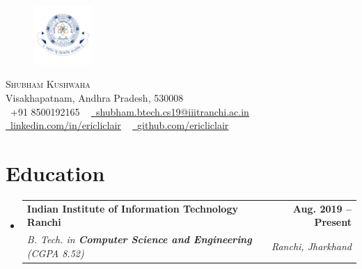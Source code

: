 \documentclass[letterpaper,11pt]{article}
\makeatletter
\newcommand{\resumeSubheading}[4]{
  \vspace{-2pt}\item
    \begin{tabular*}{1.0\textwidth}[t]{l@{\extracolsep{\fill}}r}
      \textbf{#1} & \textbf{\small #2} \\
      \textit{\small#3} & \textit{\small #4} \\
    \end{tabular*}\vspace{-7pt}
}
\newcommand{\resumeSubHeadingListStart}{\begin{itemize}[leftmargin=0.0in, label={}]}
\newcommand{\resumeSubHeadingListEnd}{\end{itemize}}
\makeatother
\begin{document}

    \begin{figure}
        {\vspace*{-0.07\textwidth}\includegraphics[width=0.2\textwidth]{images/logo.png}}
    \end{figure}
    {\Huge \scshape Shubham Kushwaha} \\ \vspace{1pt}
    Visakhapatnam, Andhra Pradesh, 530008 \\ \vspace{1pt}
    \small \raisebox{-0.1\height}\faPhone\ +91 8500192165 ~ \href{mailto:eric.liclair@gmail.com}{\raisebox{-0.2\height}\faEnvelope\  \underline{shubham.btech.cs19@iiitranchi.ac.in}} ~
    \href{https://linkedin.com/in//}{\raisebox{-0.2\height}\faLinkedin\ \underline{linkedin.com/in/ericliclair}}  ~
    \href{https://github.com/}{\raisebox{-0.2\height}\faGithub\ \underline{github.com/ericliclair}}
    \vspace{-8pt}


\section{Education}
  \resumeSubHeadingListStart
    \resumeSubheading
      {Indian Institute of Information Technology Ranchi}{Aug. 2019 -- Present}
      {B. Tech. in \textbf{Computer Science and Engineering} (CGPA 8.52)}{Ranchi, Jharkhand}
  \resumeSubHeadingListEnd

\end{document}
